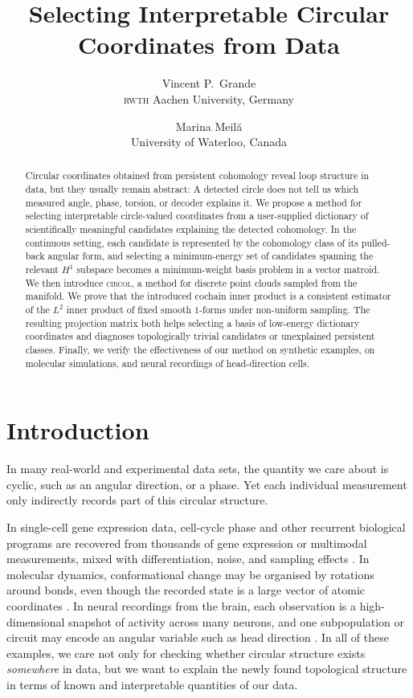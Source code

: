\documentclass[a4paper,11pt, DIV=10]{scrartcl}
\numberwithin{equation}{section}
\theoremstyle{definition}
\theoremstyle{remark}
\begin{document}
	\title{Selecting Interpretable Circular Coordinates from Data}
	\author{%
		Vincent P.\ Grande\\
		\textsc{rwth} Aachen University, Germany
		\and
		Marina Meil\u{a}\\
		University of Waterloo, Canada
	}
	\date{}
	\maketitle
	\begin{abstract}
		Circular coordinates obtained from persistent cohomology reveal loop structure in data, but they usually remain abstract: A detected circle does not tell us which measured angle, phase, torsion, or decoder explains it.
		We propose a method for selecting interpretable circle-valued coordinates from a user-supplied dictionary of scientifically meaningful candidates explaining the detected cohomology.
		In the continuous setting, each candidate is represented by the cohomology class of its pulled-back angular form, and selecting a minimum-energy set of candidates spanning the relevant \(H^1\) subspace becomes a minimum-weight basis problem in a vector matroid.
		We then introduce \textsc{circol}, a method for discrete point clouds sampled from the manifold.
		We prove that the introduced cochain inner product is a consistent estimator of the \(L^2\) inner product of fixed smooth \(1\)-forms under non-uniform sampling.
		The resulting projection matrix both helps selecting a basis of low-energy dictionary coordinates and diagnoses topologically trivial candidates or unexplained persistent classes.
		Finally, we verify the effectiveness of our method on synthetic examples, on molecular simulations, and neural recordings of head-direction cells.
	\end{abstract}
	\section{Introduction}
In many real-world and experimental data sets, the quantity we care
about is cyclic, such as an angular direction, or a phase.  Yet each
individual measurement only indirectly records part of this circular
structure.

In single-cell gene expression data, cell-cycle phase and other
recurrent biological programs are recovered from thousands of gene
expression or multimodal measurements, mixed with
differentiation, noise, and sampling
effects \cite{vandereyken2023methods,cheng2024phlower}.  In molecular
dynamics, conformational change may be organised by rotations around
bonds, even though the recorded state is a large vector of atomic
coordinates \cite{Kovacev-Nikolic:2016}.  In neural recordings from
the brain, each observation is a high-dimensional snapshot of activity
across many neurons, and one subpopulation or circuit may encode an
angular variable such as head direction \cite{taube1990headI,duszkiewicz2024local,duszkiewicz2025dandiHeadDirection}.
In all of these examples, we care not only for checking whether circular structure exists \emph{somewhere} in data, but we want to explain the newly found topological structure in terms of known and interpretable quantities of our data.
\end{document}
